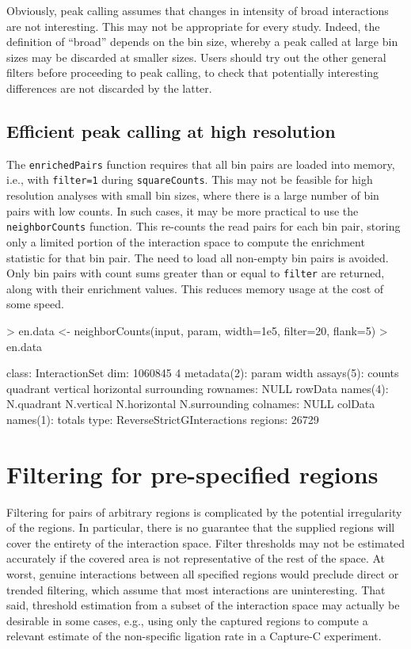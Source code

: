 \documentclass[12pt]{report}
\renewenvironment{Schunk}{\vspace{0pt}}{\vspace{0pt}}
\newcommand{\code}[1]{{\small\texttt{#1}}}
\begin{document}
Obviously, peak calling assumes that changes in intensity of broad interactions are not interesting.
This may not be appropriate for every study.
Indeed, the definition of ``broad'' depends on the bin size, whereby a peak called at large bin sizes may be discarded at smaller sizes.
Users should try out the other general filters before proceeding to peak calling, to check that potentially interesting differences are not discarded by the latter.

\subsection{Efficient peak calling at high resolution}
The \code{enrichedPairs} function requires that all bin pairs are loaded into memory, i.e., with \code{filter=1} during \code{squareCounts}.
This may not be feasible for high resolution analyses with small bin sizes, where there is a large number of bin pairs with low counts.
In such cases, it may be more practical to use the \code{neighborCounts} function.
This re-counts the read pairs for each bin pair, storing only a limited portion of the interaction space to compute the enrichment statistic for that bin pair.
The need to load all non-empty bin pairs is avoided.
Only bin pairs with count sums greater than or equal to \code{filter} are returned, along with their enrichment values.
This reduces memory usage at the cost of some speed.

\begin{Schunk}
\begin{Sinput}
> en.data <- neighborCounts(input, param, width=1e5, filter=20, flank=5)
> en.data
\end{Sinput}
\begin{Soutput}
class: InteractionSet 
dim: 1060845 4 
metadata(2): param width
assays(5): counts quadrant vertical horizontal surrounding
rownames: NULL
rowData names(4): N.quadrant N.vertical N.horizontal N.surrounding
colnames: NULL
colData names(1): totals
type: ReverseStrictGInteractions
regions: 26729
\end{Soutput}
\end{Schunk}

\section{Filtering for pre-specified regions}
Filtering for pairs of arbitrary regions is complicated by the potential irregularity of the regions.
In particular, there is no guarantee that the supplied regions will cover the entirety of the interaction space.
Filter thresholds may not be estimated accurately if the covered area is not representative of the rest of the space.
At worst, genuine interactions between all specified regions would preclude direct or trended filtering, which assume that most interactions are uninteresting.
That said, threshold estimation from a subset of the interaction space may actually be desirable in some cases, e.g., using only the captured regions to compute a relevant estimate of the non-specific ligation rate in a Capture-C experiment.
\end{document}
